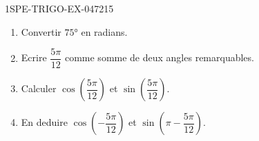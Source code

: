\begin{exercice}{1SPE-TRIGO-EX-047}{2}{15}
\begin{enumerate}
  \item Convertir $75°$ en radians.
  \item Ecrire $\dfrac{5\pi}{12}$ comme somme de deux angles remarquables.
  \item Calculer $\cos\!\left(\dfrac{5\pi}{12}\right)$ et $\sin\!\left(\dfrac{5\pi}{12}\right)$.
  \item En deduire $\cos\!\left(-\dfrac{5\pi}{12}\right)$ et $\sin\!\left(\pi - \dfrac{5\pi}{12}\right)$.
\end{enumerate}
\end{exercice}
